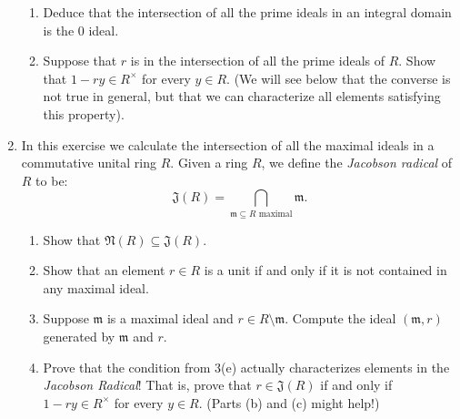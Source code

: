 \documentclass[11pt]{article}
\newcommand{\fJ}{\mathfrak{J}}
\newcommand{\fN}{\mathfrak{N}}
\newcommand{\fm}{\mathfrak{m}}
\begin{document}
\begin{enumerate}
{\begin{enumerate}
{    }
    \item{
    Deduce that the intersection of all the prime ideals in an integral domain is the 0 ideal.
    }
    \item{
    Suppose that $r$ is in the intersection of all the prime ideals of $R$.  Show that $1-ry\in R^\times$ for every $y\in R$.  (We will see below that the converse is not true in general, but that we can characterize all elements satisfying this property).
    }
  \end{enumerate}
  }
  \item{
  In this exercise we calculate the intersection of all the maximal ideals in a commutative unital ring $R$.  Given a ring $R$, we define the \textit{Jacobson radical} of $R$ to be:
  \[\fJ(R) = \bigcap_{\fm\subseteq R\text{ maximal}}\fm.\]
  \begin{enumerate}
    \item{
    Show that $\fN(R)\subseteq\fJ(R)$.
    }
    \item{
    Show that an element $r\in R$ is a unit if and only if it is not contained in any maximal ideal.
    }
    \item{
    Suppose $\fm$ is a maximal ideal and $r\in R\setminus\fm$.  Compute the ideal $(\fm,r)$ generated by $\fm$ and $r$.
    }
    \item{
    Prove that the condition from 3(e) actually characterizes elements in the \textit{Jacobson Radical}!  That is, prove that $r\in\fJ(R)$ if and only if $1-ry\in R^\times$ for every $y\in R$.  (Parts (b) and (c) might help!)
    }
  \end{enumerate}
  }
\end{enumerate}
\end{document}
